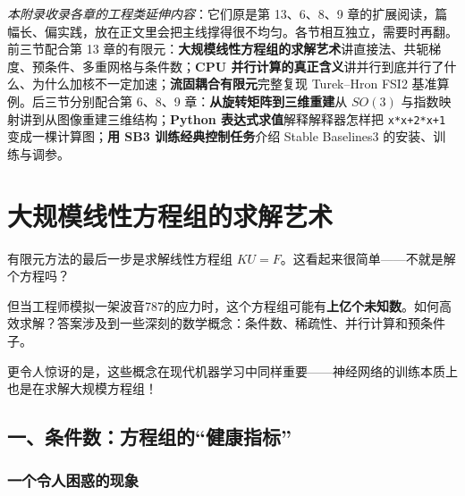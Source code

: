 
\noindent\textit{本附录收录各章的工程类延伸内容}：它们原是第 13、6、8、9 章的扩展阅读，篇幅长、偏实践，放在正文里会把主线撑得很不均匀。各节相互独立，需要时再翻。前三节配合第 13 章的有限元：\textbf{大规模线性方程组的求解艺术}讲直接法、共轭梯度、预条件、多重网格与条件数；\textbf{CPU 并行计算的真正含义}讲并行到底并行了什么、为什么加核不一定加速；\textbf{流固耦合有限元}完整复现 Turek--Hron FSI2 基准算例。后三节分别配合第 6、8、9 章：\textbf{从旋转矩阵到三维重建}从 $SO(3)$ 与指数映射讲到从图像重建三维结构；\textbf{Python 表达式求值}解释解释器怎样把 \texttt{x*x+2*x+1} 变成一棵计算图；\textbf{用 SB3 训练经典控制任务}介绍 Stable Baselines3 的安装、训练与调参。

\section*{大规模线性方程组的求解艺术}

\begin{tcolorbox}[colback=gray!5, colframe=gray!50, title=本节导读]
有限元方法的最后一步是求解线性方程组 $KU = F$。这看起来很简单——不就是解个方程吗？

但当工程师模拟一架波音787的应力时，这个方程组可能有\textbf{上亿个未知数}。如何高效求解？答案涉及到一些深刻的数学概念：条件数、稀疏性、并行计算和预条件子。

更令人惊讶的是，这些概念在现代机器学习中同样重要——神经网络的训练本质上也是在求解大规模方程组！
\end{tcolorbox}

\subsection*{一、条件数：方程组的“健康指标”}

\subsubsection*{一个令人困惑的现象}

